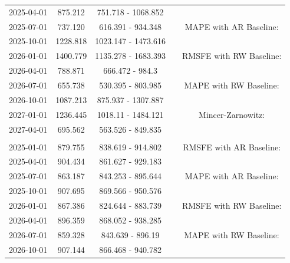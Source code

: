 \begin{table}
\begin{tabular}[t]{ccccc}
\hspace{1em}2025-04-01 & 875.212 & 751.718 - 1068.852 &  & \\
\hspace{1em}2025-07-01 & 737.120 & 616.391 - 934.348 &  & MAPE with AR Baseline:\\
\hspace{1em}2025-10-01 & 1228.818 & 1023.147 - 1473.616 &  & \\
\hspace{1em}2026-01-01 & 1400.779 & 1135.278 - 1683.393 &  & RMSFE with RW Baseline:\\
\hspace{1em}2026-04-01 & 788.871 & 666.472 - 984.3 &  & \\
\hspace{1em}2026-07-01 & 655.738 & 530.395 - 803.985 &  & MAPE with RW Baseline:\\
\hspace{1em}2026-10-01 & 1087.213 & 875.937 - 1307.887 &  & \\
\hspace{1em}2027-01-01 & 1236.445 & 1018.11 - 1484.121 &  & Mincer-Zarnowitz:\\
\hspace{1em}2027-04-01 & 695.562 & 563.526 - 849.835 &  & \\
\addlinespace[0.3em]
\multicolumn{5}{l}{\textbf{EmiCO2ManInd}}\\
\hspace{1em}2025-01-01 & 879.755 & 838.619 - 914.802 &  & RMSFE with AR Baseline:\\
\hspace{1em}2025-04-01 & 904.434 & 861.627 - 929.183 &  & \\
\hspace{1em}2025-07-01 & 863.187 & 843.253 - 895.644 &  & MAPE with AR Baseline:\\
\hspace{1em}2025-10-01 & 907.695 & 869.566 - 950.576 &  & \\
\hspace{1em}2026-01-01 & 867.386 & 824.644 - 883.739 &  & RMSFE with RW Baseline:\\
\hspace{1em}2026-04-01 & 896.359 & 868.052 - 938.285 &  & \\
\hspace{1em}2026-07-01 & 859.328 & 843.639 - 896.19 &  & MAPE with RW Baseline:\\
\hspace{1em}2026-10-01 & 907.144 & 866.468 - 940.782 &  & \\

\end{tabular}
\end{table}
